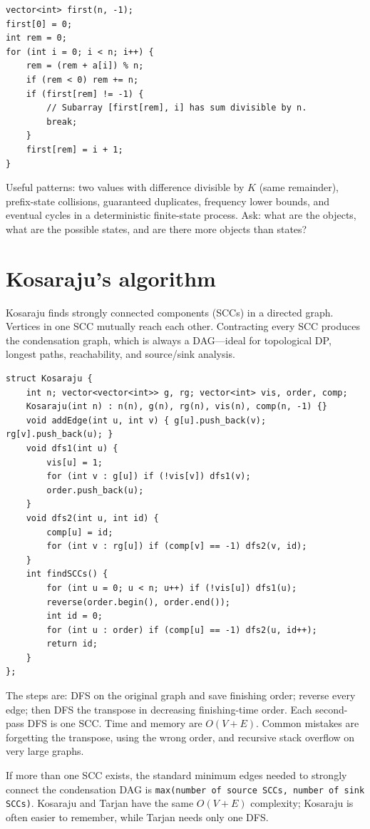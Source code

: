 \begin{lstlisting}
vector<int> first(n, -1);
first[0] = 0;
int rem = 0;
for (int i = 0; i < n; i++) {
    rem = (rem + a[i]) % n;
    if (rem < 0) rem += n;
    if (first[rem] != -1) {
        // Subarray [first[rem], i] has sum divisible by n.
        break;
    }
    first[rem] = i + 1;
}
\end{lstlisting}

Useful patterns: two values with difference divisible by $K$ (same remainder), prefix-state collisions, guaranteed duplicates, frequency lower bounds, and eventual cycles in a deterministic finite-state process. Ask: what are the objects, what are the possible states, and are there more objects than states?

\section{Kosaraju's algorithm}

Kosaraju finds strongly connected components (SCCs) in a directed graph. Vertices in one SCC mutually reach each other. Contracting every SCC produces the condensation graph, which is always a DAG---ideal for topological DP, longest paths, reachability, and source/sink analysis.

\begin{lstlisting}
struct Kosaraju {
    int n; vector<vector<int>> g, rg; vector<int> vis, order, comp;
    Kosaraju(int n) : n(n), g(n), rg(n), vis(n), comp(n, -1) {}
    void addEdge(int u, int v) { g[u].push_back(v); rg[v].push_back(u); }
    void dfs1(int u) {
        vis[u] = 1;
        for (int v : g[u]) if (!vis[v]) dfs1(v);
        order.push_back(u);
    }
    void dfs2(int u, int id) {
        comp[u] = id;
        for (int v : rg[u]) if (comp[v] == -1) dfs2(v, id);
    }
    int findSCCs() {
        for (int u = 0; u < n; u++) if (!vis[u]) dfs1(u);
        reverse(order.begin(), order.end());
        int id = 0;
        for (int u : order) if (comp[u] == -1) dfs2(u, id++);
        return id;
    }
};
\end{lstlisting}

The steps are: DFS on the original graph and save finishing order; reverse every edge; then DFS the transpose in decreasing finishing-time order. Each second-pass DFS is one SCC. Time and memory are $O(V+E)$. Common mistakes are forgetting the transpose, using the wrong order, and recursive stack overflow on very large graphs.

If more than one SCC exists, the standard minimum edges needed to strongly connect the condensation DAG is \texttt{max(number of source SCCs, number of sink SCCs)}. Kosaraju and Tarjan have the same $O(V+E)$ complexity; Kosaraju is often easier to remember, while Tarjan needs only one DFS.


